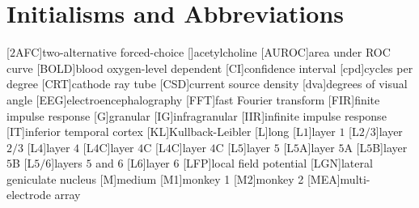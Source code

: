     \chapter*{Initialisms and Abbreviations}
    \begin{acronym}[AUROC]
        [$2$AFC]{two-alternative forced-choice}
        []{acetylcholine}
        [AUROC]{area under \acl{ROC} curve}
        [BOLD]{blood oxygen-level dependent}
        [CI]{confidence interval}
        [cpd]{cycles per degree}
        [CRT]{cathode ray tube}
        [CSD]{current source density}
        [dva]{degrees of visual angle}
        [EEG]{electroencephalography}
        [FFT]{fast Fourier transform}
        [FIR]{finite impulse response}
        [G]{granular}
        [IG]{infragranular}
        [IIR]{infinite impulse response}
        [IT]{inferior temporal cortex}
        [KL]{Kullback-Leibler}
        [L]{long}
        [L$1$]{layer $1$}
        [L$2/3$]{layer $2/3$}
        [L$4$]{layer $4$}
        [L$4$C\textalpha]{layer $4$C\textalpha{}}
        [L$4$C\textbeta]{layer $4$C\textbeta{}}
        [L$5$]{layer $5$}
        [L$5$A]{layer $5$A}
        [L$5$B]{layer $5$B}
        [L$5/6$]{layers $5$ and $6$}
        [L$6$]{layer $6$}
        [LFP]{local field potential}
        [LGN]{lateral geniculate nucleus}
        [M]{medium}
        [M1]{monkey 1}
        [M2]{monkey 2}
        [MEA]{multi-electrode array}

\end{acronym}
